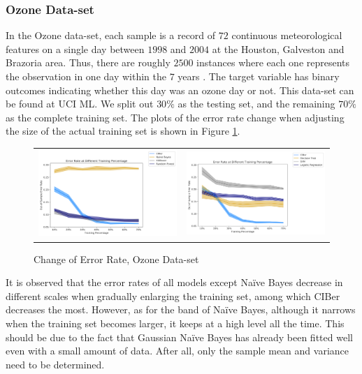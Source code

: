 \documentclass[twoside,11pt]{article}
\begin{document}
\subsubsection{Ozone Data-set}
In the Ozone data-set, each sample is a record of $72$ continuous meteorological features on a single day between $1998$ and $2004$ at the Houston, Galveston and Brazoria area. Thus, there are roughly $2500$ instances where each one represents the observation in one day within the $7$ years \citep{zhang2008forecasting}. The target variable has binary outcomes indicating whether this day was an ozone day or not. This data-set can be found at UCI ML. We split out $30\%$ as the testing set, and the remaining $70\%$ as the complete training set. The plots of the error rate change when adjusting the size of the actual training set is shown in Figure \ref{Fig_ozone}.

\begin{figure}[h]
\begin{tabular}{ll}
\includegraphics[width=0.5\linewidth]{Figures/Empirical/err_change_ozone_1.png}
&
\includegraphics[width=0.5\linewidth]{Figures/Empirical/err_change_ozone_2.png}
\end{tabular}
\caption{Change of Error Rate, Ozone Data-set}
\label{Fig_ozone}
\end{figure}

It is observed that the error rates of all models except Na\"ive Bayes decrease in different scales when gradually enlarging the training set, among which CIBer decreases the most. However, as for the band of Na\"ive Bayes, although it narrows when the training set becomes larger, it keeps at a high level all the time. This should be due to the fact that Gaussian Na\"ive Bayes has already been fitted well even with a small amount of data. After all, only the sample mean and variance need to be determined. 
\end{document}
